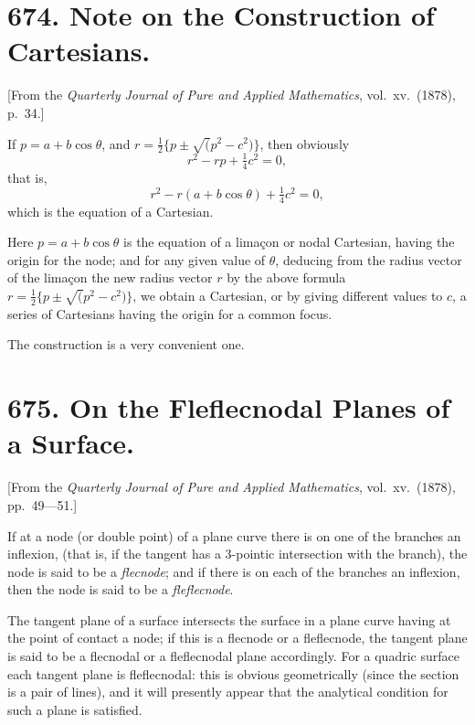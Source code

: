 \documentclass[12pt,a4paper]{article}
\theoremstyle{cayley}
\theoremstyle{definition}
\numberwithin{equation}{section}
\begin{document}
\newpage

\section*{674. Note on the Construction of Cartesians.}

[From the \textit{Quarterly Journal of Pure and Applied Mathematics}, vol.\ xv.\ (1878), p.\ 34.]

If $p = a + b \cos \theta$, and $r = \frac{1}{2}\{p \pm \surd(p^2 - c^2)\}$, then obviously
\[
r^2 - rp + \tfrac{1}{4}c^2 = 0,
\]
that is,
\[
r^2 - r(a + b \cos \theta) + \tfrac{1}{4}c^2 = 0,
\]
which is the equation of a Cartesian.

Here $p = a + b \cos \theta$ is the equation of a lima\c{c}on or nodal Cartesian, having the origin for the node; and for any given value of $\theta$, deducing from the radius vector of the lima\c{c}on the new radius vector $r$ by the above formula $r = \frac{1}{2}\{p \pm \surd(p^2 - c^2)\}$, we obtain a Cartesian, or by giving different values to $c$, a series of Cartesians having the origin for a common focus.

The construction is a very convenient one.

\newpage

\section*{675. On the Fleflecnodal Planes of a Surface.}

[From the \textit{Quarterly Journal of Pure and Applied Mathematics}, vol.\ xv.\ (1878), pp.\ 49---51.]

If at a node (or double point) of a plane curve there is on one of the branches an inflexion, (that is, if the tangent has a 3-pointic intersection with the branch), the node is said to be a \textit{flecnode}; and if there is on each of the branches an inflexion, then the node is said to be a \textit{fleflecnode}.

The tangent plane of a surface intersects the surface in a plane curve having at the point of contact a node; if this is a flecnode or a fleflecnode, the tangent plane is said to be a flecnodal or a fleflecnodal plane accordingly. For a quadric surface each tangent plane is fleflecnodal: this is obvious geometrically (since the section is a pair of lines), and it will presently appear that the analytical condition for such a plane is satisfied.
\end{document}

